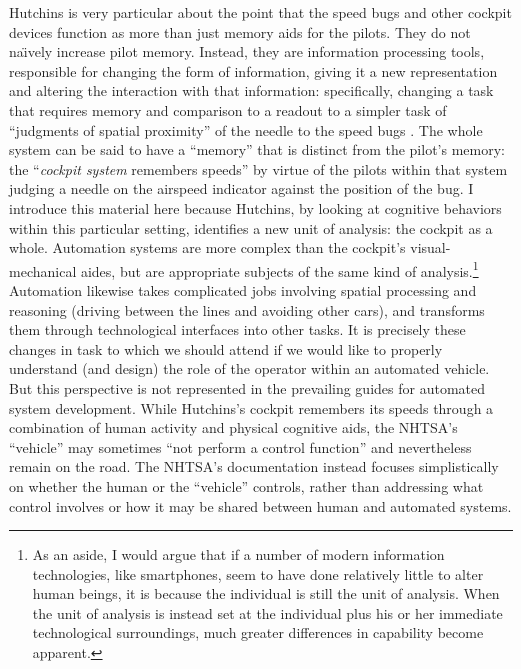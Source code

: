 Hutchins is very particular about the point that the speed bugs and
other cockpit devices function as more than just memory aids for the
pilots. They do not na\"{\i}vely increase pilot memory. Instead, they
are information processing tools, responsible for changing the form of
information, giving it a new representation and altering the
interaction with that information: specifically, changing a task that
requires memory and comparison to a readout to a simpler task of
``judgments of spatial proximity'' of the needle to the speed
bugs \cite[p. 282]{hutchinsCockpit}. The whole system can be said to
have a ``memory'' that is distinct from the pilot's memory: the
``\emph{cockpit system} remembers speeds'' by virtue of the pilots
within that system judging a needle on the airspeed indicator against
the position of the bug.\cite[p.
  283]{hutchinsCockpit} I introduce this material here because
Hutchins, by looking at cognitive behaviors within this particular
setting, identifies a new unit of analysis: the cockpit as a whole.
Automation systems are more complex than the cockpit's
visual-mechanical aides, but are appropriate subjects of the same kind
of analysis.\footnote{As an aside, I would argue that if a number of
  modern information technologies, like smartphones, seem to have done
relatively little to alter human beings, it is because the individual
is still the unit of analysis. When the unit of analysis is instead
set at the individual plus his or her immediate technological
surroundings, much greater differences in capability become apparent.}
Automation likewise takes complicated jobs involving spatial
processing and reasoning (driving between the lines and avoiding other
cars), and transforms them through technological interfaces into other
tasks. It is precisely these changes in task to which we should attend
if we would like to properly understand (and design) the role of the
operator within an automated vehicle. But this perspective is not
represented in the prevailing guides for automated system development.
While Hutchins's cockpit remembers its speeds through a combination of
human activity and physical cognitive aids, the NHTSA's ``vehicle''
may sometimes ``not perform a control function''\cite[p. 3]{NHTSA} and
nevertheless remain on the road. The NHTSA's documentation instead
focuses simplistically on whether the human or the ``vehicle''
controls, rather than addressing what control involves or how it may
be shared between human and automated systems.

